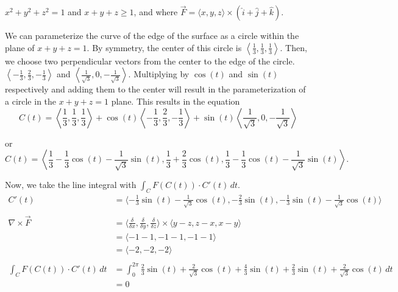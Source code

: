 \documentclass[12pt]{exam}
\begin{document}
\begin{questions}
$x^2 + y^2 + z^2 = 1$ and $x + y + z \geq 1$, and where $\overrightarrow{F} = \langle x, y, z \rangle \times \left(\hat{i} + \hat{j} + \hat{k}\right)$.
    \begin{solution}
        We can parameterize the curve of the edge of the surface as a circle within the plane of $x + y + z = 1$. By symmetry, the center of this circle is $\left\langle\frac{1}{3}, \frac{1}{3}, \frac{1}{3}\right\rangle$. Then, we choose two perpendicular vectors from the center to the edge of the circle. $\left\langle -\frac{1}{3}, \frac{2}{3}, -\frac{1}{3} \right\rangle$ and $\left\langle \frac{1}{\sqrt{3}}, 0, -\frac{1}{\sqrt{3}} \right\rangle$. Multiplying by $\cos(t)$ and $\sin(t)$ respectively and adding them to the center will result in the parameterization of a circle in the $x + y + z = 1$ plane. This results in the equation
        \[ C(t) = \left\langle\frac{1}{3}, \frac{1}{3}, \frac{1}{3}\right\rangle + \cos(t)\left\langle -\frac{1}{3}, \frac{2}{3}, -\frac{1}{3} \right\rangle + \sin(t)\left\langle \frac{1}{\sqrt{3}}, 0, -\frac{1}{\sqrt{3}} \right\rangle \]
        \begin{center}
        or 
        \[ C(t) = \left\langle \frac{1}{3} - \frac{1}{3}\cos(t) - \frac{1}{\sqrt{3}}\sin(t), \frac{1}{3} + \frac{2}{3}\cos(t), \frac{1}{3} - \frac{1}{3} \cos(t) - \frac{1}{\sqrt{3}}\sin(t) \right\rangle.\]
        \end{center}
        Now, we take the line integral with $\int_C F(C(t))\cdot C'(t)\,dt$. 
        \begin{align*}
            C'(t) &= \langle -\frac{1}{3}\sin(t) - \frac{1}{\sqrt{3}}\cos(t), -\frac{2}{3}\sin(t), -\frac{1}{3}\sin(t) - \frac{1}{\sqrt{3}}\cos(t) \rangle \\\\
            \nabla \times \overrightarrow{F} &= \langle \frac{\delta}{\delta x}, \frac{\delta}{\delta y}, \frac{\delta}{\delta z}\rangle \times \langle y-z, z-x, x-y\rangle \\
            &= \langle -1 - 1, -1 - 1, -1 - 1 \rangle \\
            &= \langle -2, -2, -2 \rangle \\\\
            \int_C F(C(t))\cdot C'(t)\,dt &= \int_{0}^{2\pi} \frac{2}{3}\sin(t)+\frac{2}{\sqrt{3}}\cos(t)+\frac{4}{3}\sin(t)+\frac{2}{3}\sin(t)+\frac{2}{\sqrt{3}}\cos(t)\,dt\\
            &= \boxed{0}
        \end{align*}
    \end{solution}
    \clearpage


\end{questions}
\end{document}
